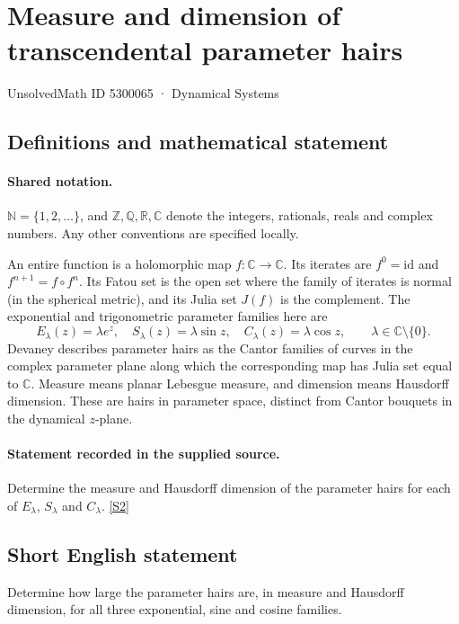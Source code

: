 \documentclass[11pt]{article}
\newcommand{\sref}[2]{\hyperlink{source:#1:#2}{[S#2]}}
\begin{document}
\setcounter{section}{5300064}
\section{Measure and dimension of transcendental parameter hairs}\label{5300065}
{\small\sffamily UnsolvedMath ID 5300065 · Dynamical Systems}
\subsection{Definitions and mathematical statement}

\paragraph{Shared notation.}$\mathbb N=\{1,2,\ldots\}$, and $\mathbb Z,\mathbb Q,\mathbb R,\mathbb C$ denote the integers, rationals, reals and complex numbers. Any other conventions are specified locally.


An entire function is a holomorphic map $f:\mathbb C\to\mathbb C$. Its iterates are $f^0=\mathrm{id}$ and $f^{n+1}=f\circ f^n$. Its Fatou set is the open set where the family of iterates is normal (in the spherical metric), and its Julia set $J(f)$ is the complement. The exponential and trigonometric parameter families here are
\[E_\lambda(z)=\lambda e^z,\quad S_\lambda(z)=\lambda\sin z,\quad C_\lambda(z)=\lambda\cos z,\qquad \lambda\in\mathbb C\setminus\{0\}.\]Devaney describes parameter hairs as the Cantor families of curves in the complex parameter plane along which the corresponding map has Julia set equal to $\mathbb C$. Measure means planar Lebesgue measure, and dimension means Hausdorff dimension. These are hairs in parameter space, distinct from Cantor bouquets in the dynamical $z$-plane.
\paragraph{Statement recorded in the supplied source.}
Determine the measure and Hausdorff dimension of the parameter hairs for each of $E_\lambda$, $S_\lambda$ and $C_\lambda$. \sref{5300065}{2}
\subsection{Short English statement}
Determine how large the parameter hairs are, in measure and Hausdorff dimension, for all three exponential, sine and cosine families.
\end{document}
